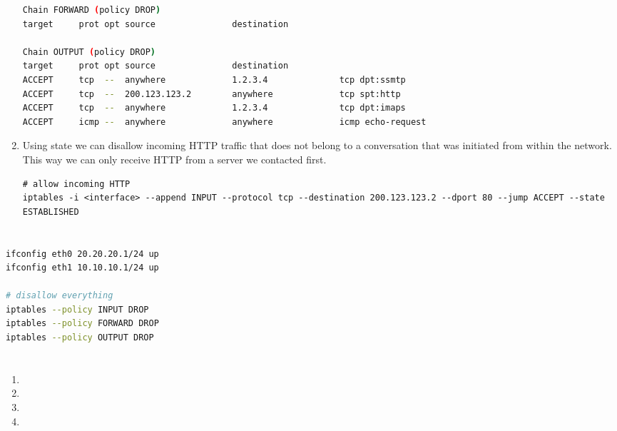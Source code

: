 \documentclass[12pt, a4paper]{article}
\begin{document}
\begin{enumerate}[a]
\begin{lstlisting}[language=bash]
Chain FORWARD (policy DROP)
target     prot opt source               destination

Chain OUTPUT (policy DROP)
target     prot opt source               destination
ACCEPT     tcp  --  anywhere             1.2.3.4              tcp dpt:ssmtp
ACCEPT     tcp  --  200.123.123.2        anywhere             tcp spt:http
ACCEPT     tcp  --  anywhere             1.2.3.4              tcp dpt:imaps
ACCEPT     icmp --  anywhere             anywhere             icmp echo-request
	\end{lstlisting}
	\item %
	Using state we can disallow incoming HTTP traffic that does not belong to a conversation that was initiated from within the network. This way we can only receive HTTP from a server we contacted first.

	\begin{lstlisting}
# allow incoming HTTP
iptables -i <interface> --append INPUT --protocol tcp --destination 200.123.123.2 --dport 80 --jump ACCEPT --state ESTABLISHED
	\end{lstlisting}
\end{enumerate}

\section{} %
\begin{lstlisting}[language=bash]
ifconfig eth0 20.20.20.1/24 up
ifconfig eth1 10.10.10.1/24 up

# disallow everything
iptables --policy INPUT DROP
iptables --policy FORWARD DROP
iptables --policy OUTPUT DROP
\end{lstlisting}

\section{} %
\begin{enumerate}[a]
	\item %
	\item %
	\item %
	\item %
\end{enumerate}
\end{document}
